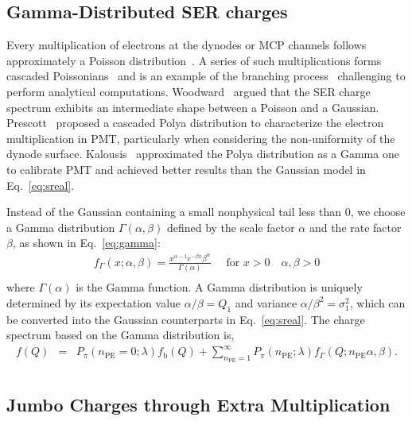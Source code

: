 \subsection{Gamma-Distributed SER charges}\label{gammapossion}
Every multiplication of electrons at the dynodes or MCP channels follows approximately a Poisson distribution~\cite{branchandPoisson}.
A series of such multiplications forms cascaded Poissonians~\cite{1955Scintillation} and is
an example of the branching process~\cite{Bartlett1963TheTO} challenging to perform analytical computations.
Woodward~\cite{Woodward} argued that the SER charge spectrum exhibits an intermediate shape between a Poisson and a Gaussian.
Prescott~\cite{polya} proposed a cascaded Polya distribution to characterize the electron multiplication in PMT,
particularly when considering the non-uniformity of the dynode surface.
Kalousis~\cite{2012Calibration,2020A} approximated the Polya distribution as a Gamma one to calibrate PMT
and achieved better results than the Gaussian model in Eq.~\eqref{eq:sreal}.

Instead of the Gaussian containing a small nonphysical tail less than 0,
we choose a Gamma distribution $\varGamma(\alpha, \beta)$
defined by the scale factor $\alpha$ and the rate factor $\beta$, as shown in Eq.~\eqref{eq:gamma}:
\begin{equation}
	\label{eq:gamma}
	\begin{aligned}
		f_\Gamma(x ; \alpha, \beta) = \frac{x^{\alpha-1} e^{-\beta x} \beta^\alpha}{\Gamma(\alpha)} \quad \text { for } x>0 \quad \alpha, \beta>0 \\
	\end{aligned}
\end{equation}
where $\Gamma(\alpha)$ is the Gamma function.
A Gamma distribution is uniquely determined by its expectation value \(\alpha/\beta=Q_1\) and variance \(\alpha/\beta^2=\sigma_1^2\),
which can be converted into the Gaussian counterparts in Eq.~\eqref{eq:sreal}.
The charge spectrum based on the Gamma distribution is,
\begin{equation}
	\begin{aligned}
		f(Q) & = & P_{\pi}(n_{\mathrm{PE}}=0;\lambda)f_{\mathrm{b}}(Q) + \sum_{n_{\mathrm{PE}}=1}^{\infty}P_\pi(n_{\mathrm{PE}};\lambda) f_\Gamma(Q;n_{\mathrm{PE}}\alpha, \beta). \\
	\end{aligned}
	\label{eq:Gamma}
\end{equation}

\subsection{Jumbo Charges through Extra Multiplication}\label{sec:see}

